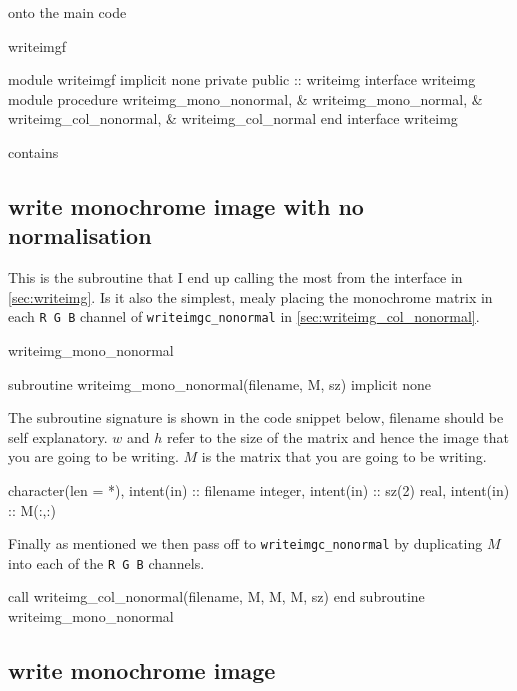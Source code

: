 \documentclass[a4paper]{article}
\begin{document}
onto the main code
\begin{codeblock}{writeimgf}
\begin{code}
module writeimgf
	implicit none
	private 
	public :: writeimg
	interface writeimg
		module procedure writeimg_mono_nonormal, &
		                 writeimg_mono_normal,   &
		                 writeimg_col_nonormal,  &
		                 writeimg_col_normal
	end interface writeimg

	contains
\end{code}

\subsection{write monochrome image with no normalisation}
\label{sec:writeimgm_nonormal}

This is the subroutine that I end up calling the most from the interface in \autoref{sec:writeimg}. Is it also the simplest, mealy placing the monochrome matrix in each \texttt{R G B} channel of \texttt{writeimgc\_nonormal} in \autoref{sec:writeimg_col_nonormal}.
\begin{codeblock}[noref]{writeimg_mono_nonormal}
\begin{code}
	subroutine writeimg_mono_nonormal(filename, M, sz)
		implicit none
\end{code}

The subroutine signature is shown in the code snippet below, filename should be self explanatory. $w$ and $h$ refer to the size of the matrix and hence the image that you are going to be writing. $M$ is the matrix that you are going to be writing. 

\begin{code}
		character(len = *), intent(in) :: filename
		integer, intent(in) :: sz(2)
		real, intent(in) :: M(:,:)
\end{code}

Finally as mentioned we then pass off to \texttt{writeimgc\_nonormal} by duplicating $M$ into each of the \texttt{R G B} channels.

\begin{code}
		call writeimg_col_nonormal(filename, M, M, M, sz)
	end subroutine writeimg_mono_nonormal
\end{code}
\end{codeblock}

\subsection{write monochrome image}
\label{sec:writeimgm_normal}


\end{codeblock}
\end{document}
